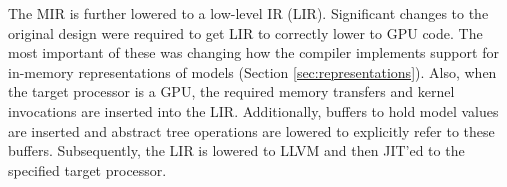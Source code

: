 The MIR is further lowered to a low-level IR (LIR). 
Significant changes to the original \TreebeardOLD{} design were required to get
LIR to correctly lower to GPU code. The most important of these was 
changing how the compiler implements support for in-memory 
representations of models (Section \ref{sec:representations}).
Also, when the target processor is a GPU, the required memory transfers and kernel
invocations are inserted into the LIR. Additionally, buffers 
to hold model values are inserted and abstract tree operations are lowered to
explicitly refer to these buffers.
Subsequently, the LIR is lowered to LLVM and then JIT'ed to the 
specified target processor.


